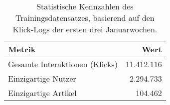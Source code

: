 
\begin{table}[H]
    \centering
    \caption{Statistische Kennzahlen des Trainingsdatensatzes, basierend auf den Klick-Logs der ersten drei Januarwochen.}
    \label{tab:statistiken_training}
    \begin{tabular}{lr}
        \toprule
        \textbf{Metrik} & \textbf{Wert} \\
        \midrule
        Gesamte Interaktionen (Klicks) & 11.412.116 \\
        Einzigartige Nutzer & 2.294.733 \\
        Einzigartige Artikel & 104.462 \\
        \bottomrule
    \end{tabular}
\end{table}